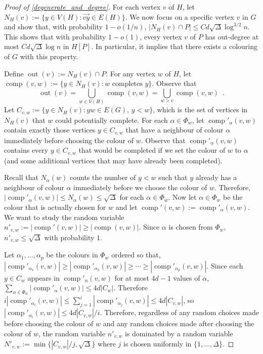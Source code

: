\documentclass[kpfonts]{patmorin}
\DeclareMathOperator{\outn}{out}
\DeclareMathOperator{\comp}{comp}
\begin{document}
\begin{proof}[Proof of \cref{degenerate_and_degree}]
  For each vertex $v$ of $H$, let $N_H(v):=\{y\in V(H): \overrightarrow{vy}\in E(H)\}$.  We now focus on a specific vertex $v$ in $G$ and show that, with probability $1-o(1/n)$, $|N_H(v)\cap P|\le Cd\sqrt{\Delta}\log^{3/2} n$.  This shows that with probability $1-o(1)$, every vertex $v$ of $P$ has out-degree at most $Cd\sqrt{\Delta}\log n$ in $H[P]$.  In particular, it implies that there exists a colouring of $G$ with this property.

   Define $\outn(v):=N_H(v)\cap P$. For any vertex $w$ of $H$, let $\comp(v,w):=\{y\in N_H(v):\text{$w$ completes $y$}\}$.  Observe that
  \[
    \outn(v) = \bigcup_{w\in V(H)} \comp(v,w) = \bigcup_{w>v} \comp(v,w) \enspace .
  \]
  Let $C_{v,w}:=\{y\in N_H(v): yw\in E(G),\, y < w\}$, which is the set of vertices in $N_H(v)$ that $w$ could potentially complete.  For each $\alpha\in\Phi_w$, let $\comp'_\alpha(v,w)$ contain exactly those vertices $y\in C_{v,w}$ that have a neighbour of colour $\alpha$ immediately before choosing the colour of $w$.  Observe that $\comp'_\alpha(v,w)$ contains every $y\in C_{v,w}$ that would be completed if we set the colour of $w$ to $\alpha$ (and some additional vertices that may have already been completed).

  Recall that $N_\alpha(w)$ counts the number of $y < w$ such that $y$ already has a neighbour of colour $\alpha$ immediately before we choose the colour of $w$.  Therefore,  $|\comp'_\alpha(v,w)|\le N_\alpha(w)\le \sqrt{\Delta}$ for each $\alpha\in\Phi_w$.  Now let $\alpha\in\Phi_w$ be the colour that is actually chosen for $w$ and let $\comp'(v,w):=\comp'_\alpha(v,w)$.  We want to study the random variable $n'_{v,w}:=|\comp'(v,w)|\ge |\comp(v,w)|$.  Since $\alpha$ is chosen from $\Phi_w$, $n'_{v,w}\le\sqrt{\Delta}$ with probability $1$.



  Let $\alpha_1,\ldots,\alpha_p$ be the colours in $\Phi_w$ ordered so that, $|\comp'_{\alpha_1}(v,w)|\ge|\comp'_{\alpha_2}(v,w)|\ge\cdots\ge |\comp'_{\alpha_p}(v,w)|$.  Since each $y\in C_w$ appears in
  $\comp'_{\alpha}(v,w)$ for at most $4d-1$ values of $\alpha$,  $\sum_{\alpha\in\Phi_w} |\comp'_{\alpha}(v,w)| \le 4d|C_w|$.
  Therefore $i|\comp'_{\alpha_i}(v,w)|\le\sum_{j=1}^i|\comp'_{\alpha_j}(v,w)|\le 4d|C_{v,w}|$, so $|\comp'_{\alpha_i}(v,w)|\le 4d|C_{v,w}|/i$.    Therefore, regardless of any random choices made before choosing the colour of $w$ and any random choices made after choosing the colour of $w$, the random variable $n'_{v,w}$ is dominated by a random variable $N'_{v,w}:=\min\{|C_{v,w}|/j,\sqrt{\Delta}\}$ where $j$ is chosen uniformly in $\{1,\ldots,\Delta\}$.


\end{proof}
\end{document}
